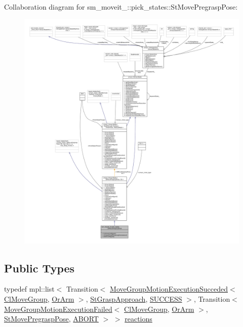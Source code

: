 Collaboration diagram for sm\+\_\+moveit\+\_\+:\+:pick\+\_\+states\+:\+:St\+Move\+Pregrasp\+Pose\+:
\nopagebreak
\begin{figure}[H]
\begin{center}
\leavevmode
\includegraphics[width=350pt]{structsm__moveit__3_1_1pick__states_1_1StMovePregraspPose__coll__graph}
\end{center}
\end{figure}
\subsection*{Public Types}
\begin{DoxyCompactItemize}
\item 
typedef mpl\+::list$<$ Transition$<$ \hyperlink{structmoveit__z__client_1_1MoveGroupMotionExecutionSucceded}{Move\+Group\+Motion\+Execution\+Succeded}$<$ \hyperlink{classmoveit__z__client_1_1ClMoveGroup}{Cl\+Move\+Group}, \hyperlink{classsm__moveit__3_1_1OrArm}{Or\+Arm} $>$, \hyperlink{structsm__moveit__3_1_1pick__states_1_1StGraspApproach}{St\+Grasp\+Approach}, \hyperlink{classSUCCESS}{S\+U\+C\+C\+E\+SS} $>$, Transition$<$ \hyperlink{structmoveit__z__client_1_1MoveGroupMotionExecutionFailed}{Move\+Group\+Motion\+Execution\+Failed}$<$ \hyperlink{classmoveit__z__client_1_1ClMoveGroup}{Cl\+Move\+Group}, \hyperlink{classsm__moveit__3_1_1OrArm}{Or\+Arm} $>$, \hyperlink{structsm__moveit__3_1_1pick__states_1_1StMovePregraspPose}{St\+Move\+Pregrasp\+Pose}, \hyperlink{classABORT}{A\+B\+O\+RT} $>$ $>$ \hyperlink{structsm__moveit__3_1_1pick__states_1_1StMovePregraspPose_a97718c3b3ef152ea2703c7fb5eb9c416}{reactions}
\end{DoxyCompactItemize}

